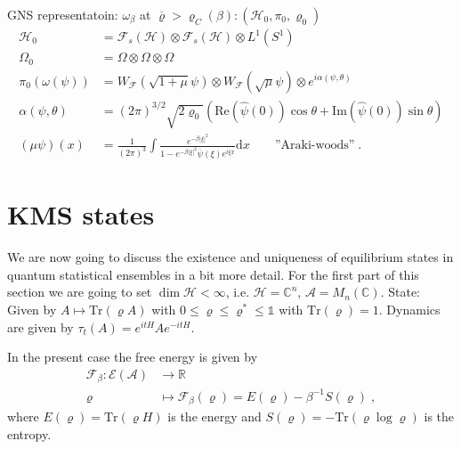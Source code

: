 \documentclass[
a4paper, %
11pt, %
onecolumn, %
openany, %
]{memoir}
\theoremstyle{definition}
\theoremstyle{remark}
\theoremstyle{plain}
\begin{document}
GNS representatoin: $\omega_{\beta}$ at $\overline{\varrho}>\varrho_C(\beta):(\mathcal{H}_0,\pi_0,\varrho_0)$ \begin{align}
\mathcal{H}_0&=\mathcal{F}_s(\mathcal{H})\otimes \mathcal{F}_s(\mathcal{H})\otimes L^1(S^1)\\
\Omega_0&=\Omega\otimes\Omega\otimes\Omega\\
\pi_0(\omega(\psi))&=W_{\mathcal{F}}(\sqrt{1+\mu}\psi)\otimes W_{\mathcal{F}}(\sqrt{\mu}\psi)\otimes e^{i\alpha(\psi,\theta)}\\ \alpha(\psi,\theta)&=(2\pi)^{3/2}\sqrt{2\varrho_0} \left(\mathrm{Re}(\hat{\psi}(0))\cos\theta+\mathrm{Im}(\hat{\psi}(0))\sin\theta\right)\\
(\mu\psi)(x)&=\frac{1}{(2\pi)^3}\int\frac{e^{-\beta|\xi|^2}}{1-e^{-\beta|\xi|^2}\overline{\psi}(\xi)e^{i\xi x}}\mathrm{d}x \qquad \text{''Araki-woods''}\;.
\end{align}
 \section{KMS states}\label{sec::kms_states}
 We are now going to discuss the existence and uniqueness of equilibrium states in quantum statistical ensembles in a bit more detail. For the first part of this section we are going to set $\dim\mathcal{H}<\infty$, i.e. $\mathcal{H}=\mathbb{C}^n$, $\mathcal{A}=M_n(\mathbb{C})$. State: Given by $A\mapsto\mathrm{Tr}(\varrho A)$ with $0\leq \varrho\leq \varrho^*\leq \mathds{1}$ with $\mathrm{Tr}(\varrho)=1$. Dynamics are given by $\tau_t(A)=e^{itH}Ae^{-itH}$.\\
 {\centering{}\par}
 In the present case the free energy is given by \begin{align}
 \mathcal{F}_{\beta}:\mathcal{E}(\mathcal{A})&\longrightarrow \mathbb{R}\\
 \varrho &\longmapsto \mathcal{F}_{\beta}(\varrho)=E(\varrho)-\beta^{-1}S(\varrho)\;,
 \end{align}
 where $E(\varrho)=\mathrm{Tr}(\varrho H)$ is the energy and
 $S(\varrho)=-\mathrm{Tr}(\varrho\log\varrho)$ is the entropy.
\end{document}
